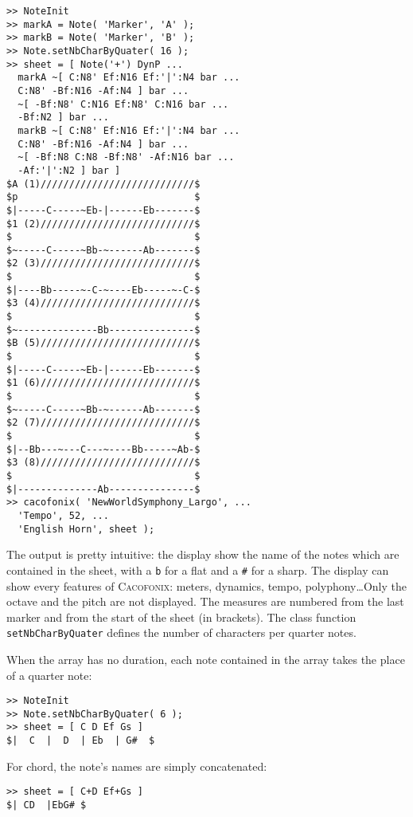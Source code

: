 \documentclass{article}
\newcommand{\cacofonix}{\textsc{Cacofonix}\xspace}
\begin{document}
\begin{lstlisting}
>> NoteInit
>> markA = Note( 'Marker', 'A' );
>> markB = Note( 'Marker', 'B' );
>> Note.setNbCharByQuater( 16 );
>> sheet = [ Note('+') DynP ...
  markA ~[ C:N8' Ef:N16 Ef:'|':N4 bar ...
  C:N8' -Bf:N16 -Af:N4 ] bar ...
  ~[ -Bf:N8' C:N16 Ef:N8' C:N16 bar ...
  -Bf:N2 ] bar ...
  markB ~[ C:N8' Ef:N16 Ef:'|':N4 bar ...
  C:N8' -Bf:N16 -Af:N4 ] bar ...
  ~[ -Bf:N8 C:N8 -Bf:N8' -Af:N16 bar ...
  -Af:'|':N2 ] bar ]
$A (1)///////////////////////////$
$p                               $
$|-----C-----~Eb-|------Eb-------$
$1 (2)///////////////////////////$
$                                $
$~-----C-----~Bb-~------Ab-------$
$2 (3)///////////////////////////$
$                                $
$|----Bb-----~-C-~----Eb-----~-C-$
$3 (4)///////////////////////////$
$                                $
$~--------------Bb---------------$
$B (5)///////////////////////////$
$                                $
$|-----C-----~Eb-|------Eb-------$
$1 (6)///////////////////////////$
$                                $
$~-----C-----~Bb-~------Ab-------$
$2 (7)///////////////////////////$
$                                $
$|--Bb---~---C---~----Bb-----~Ab-$
$3 (8)///////////////////////////$
$                                $
$|--------------Ab---------------$
>> cacofonix( 'NewWorldSymphony_Largo', ...
  'Tempo', 52, ...
  'English Horn', sheet );
\end{lstlisting}

The output is pretty intuitive: the display show the name of the notes which are contained in the sheet, with a \lstinline!b! for a flat and a \lstinline!#! for a sharp. The display can show every features of \cacofonix: meters, dynamics, tempo, polyphony\dots Only the octave and the pitch are not displayed. The measures are numbered from the last marker and from the start of the sheet (in brackets). The class function \lstinline!setNbCharByQuater! defines the number of characters per quarter notes.

When the array has no duration, each note contained in the array takes the place of a quarter note:
\begin{lstlisting}
>> NoteInit
>> Note.setNbCharByQuater( 6 );
>> sheet = [ C D Ef Gs ]
$|  C  |  D  | Eb  | G#  $
\end{lstlisting}

For chord, the note's names are simply concatenated:
\begin{lstlisting}
>> sheet = [ C+D Ef+Gs ]
$| CD  |EbG# $
\end{lstlisting}
\end{document}
